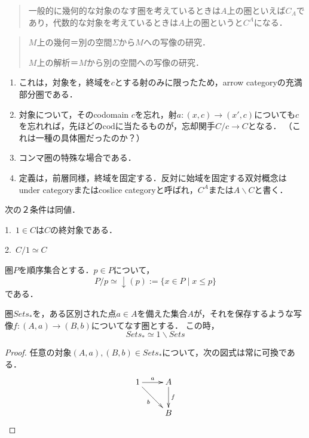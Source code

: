 \documentclass[uplatex, dvipdfmx]{jsreport}
\begin{document}
\begin{remark}\mbox{}
    \begin{quote}
        一般的に幾何的な対象のなす圏を考えているときは$A$上の圏といえば$C_A$であり，代数的な対象を考えているときは$A$上の圏というと$C^A$になる．
    \end{quote}
    \begin{definition*}\mbox{}
        \begin{quotation}
            $M$上の幾何＝別の空間$\Sigma$から$M$への写像の研究．

            $M$上の解析＝$M$から別の空間への写像の研究．
        \end{quotation}
    \end{definition*}
    \begin{enumerate}
        \item これは，対象を，終域を$c$とする射のみに限ったため，arrow categoryの充満部分圏である．
        \item 対象について，そのcodomain $c$を忘れ，射$a:(x,c)\to (x',c)$についても$c$を忘れれば，先ほどの$\mathrm{cod}$に当たるものが，忘却関手$C/c\to C$となる．
        （これは一種の具体圏だったのか？）
        \item コンマ圏の特殊な場合である．
        \item 定義は，前層同様，終域を固定する．反対に始域を固定する双対概念はunder categoryまたはcoslice categoryと呼ばれ，$C^A$または$A\backslash C$と書く．
    \end{enumerate}
\end{remark}

\begin{proposition}
    次の２条件は同値．\rm{}

    1.\, $1\in C$は$C$の終対象である．

    2.\, $C/1\simeq C$
\end{proposition}

\begin{proposition}
    圏$P$を順序集合とする．$p\in P$について，
    $$P/p\simeq\downarrow (p):=\{ x\in P \mid x\le p \}$$である．
\end{proposition}

\begin{proposition}[Setでの例]
    圏$Sets_*$を，ある区別された点$a\in A$を備えた集合$A$が，それを保存するような写像$f:(A,a)\to (B,b)$についてなす圏とする．
    この時，$$Sets_*\simeq 1\backslash Sets$$
\end{proposition}
\begin{proof}
    任意の対象$(A,a),(B,b)\in Sets_*$について，次の図式は常に可換である．
    \[\xymatrix{
        1\ar[r]^-a\ar[dr]_-b&A\ar[d]^-f\\
        &B
    }\]
\end{proof}
\end{document}
